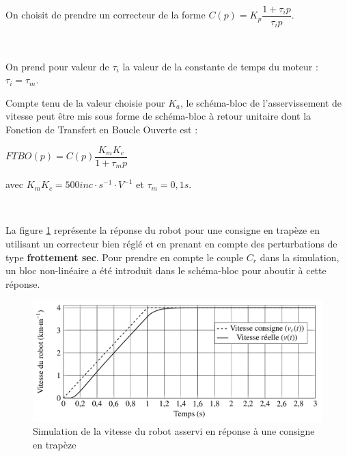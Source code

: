 ~\

On choisit de prendre un correcteur de la forme $C(p)=K_p\dfrac{1+\tau_i p}{\tau_i p}$.


~\

On prend pour valeur de $\tau_i$ la valeur de la constante de temps du moteur : $\tau_i =\tau_m$.

\newpage

Compte tenu de la valeur choisie pour $K_a$, le schéma-bloc de l'asservissement de vitesse peut être mis sous forme de schéma-bloc à retour unitaire dont la Fonction de Transfert en Boucle Ouverte est :
\begin{center}
	$FTBO(p)=C(p)\dfrac{K_mK_c}{1+\tau_mp}$
\end{center}
avec $K_mK_c=500inc\cdot s^{-1}\cdot V^{-1}$ et $\tau_m=0,1s$.


~\

La figure \ref{fig06} représente la réponse du robot pour une consigne en trapèze en utilisant un correcteur bien réglé et en prenant en compte des perturbations de type \textbf{frottement sec}. Pour prendre en compte le couple $C_r$ dans la simulation, un bloc non-linéaire a été introduit dans le schéma-bloc pour aboutir à cette réponse.

\begin{figure}[ht!]
\begin{center}
 \includegraphics[width=0.7\linewidth]{img/fig06}
\end{center}
\caption{Simulation de la vitesse du robot asservi en réponse à une consigne en trapèze}
\label{fig06}
\end{figure}


